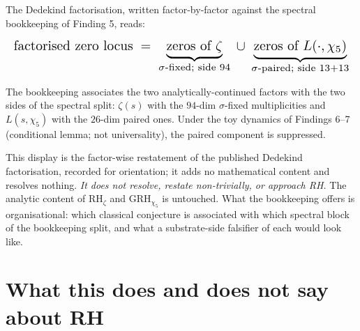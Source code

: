 \documentclass[11pt,a4paper]{article}
\begin{document}
\begin{tcolorbox}[colback=red!2,colframe=red!50!black,
  title={Reading (exploratory): the factorised zero locus, in substrate bookkeeping}]
The Dedekind factorisation, written factor-by-factor against the
spectral bookkeeping of Finding 5, reads:

\[
\resizebox{\linewidth}{!}{$
\text{factorised zero locus}
\;=\;
\underbrace{\text{zeros of }\zeta}_{\text{$\sigma$-fixed; side $94$}}
\;\cup\;
\underbrace{\text{zeros of }L(\cdot,\chi_5)}_{\text{$\sigma$-paired; side $13{+}13$}}
$}
\]

\noindent
The bookkeeping associates the two analytically-continued factors
with the two sides of the spectral split: $\zeta(s)$ with the
$94$-dim $\sigma$-fixed multiplicities and $L(s, \chi_5)$ with
the $26$-dim paired ones. Under the toy dynamics of Findings 6--7
(conditional lemma; not universality), the paired component is
suppressed.

This display is the factor-wise restatement of the published
Dedekind factorisation, recorded for orientation; it adds no
mathematical content and resolves nothing. \emph{It does not
resolve, restate non-trivially, or approach RH.} The analytic
content of $\mathrm{RH}_\zeta$ and $\mathrm{GRH}_{\chi_5}$ is
untouched. What the bookkeeping offers is organisational: which
classical conjecture is associated with which spectral block of
the bookkeeping split, and what a substrate-side falsifier of each
would look like.
\end{tcolorbox}

\section{What this does and does not say about RH}
\label{sec:scope}
\end{document}
